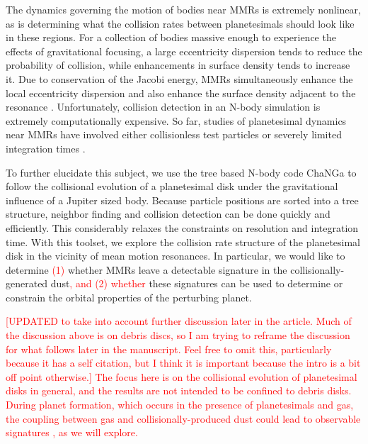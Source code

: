 \documentclass[twocolumn]{aastex63}
\newcommand{\ACBc}[1]{\textcolor{red}{#1}}
\begin{document}
The dynamics governing the motion of bodies near MMRs is extremely nonlinear, as is determining what the collision rates between planetesimals 
should look like in these regions. For a collection of bodies massive enough to experience the effects of gravitational focusing, a large eccentricity 
dispersion tends to reduce the probability of collision, while enhancements in surface density tends to increase it. Due to conservation of the Jacobi 
energy, MMRs simultaneously enhance the local eccentricity dispersion and also enhance the surface density adjacent to the resonance 
\citep{2000Icar..143...45R, 2017ApJ...850..103B}. Unfortunately, collision detection in an N-body simulation is extremely computationally expensive. 
So far, studies of planetesimal dynamics near MMRs have involved either collisionless test particles 
\citep{2017ApJ...850..103B, 2016ApJ...818..159T, 2018ApJ...857....3T} or severely limited integration times \citep{2000Icar..143...45R}.

To further elucidate this subject, we use the tree based N-body code {\sc ChaNGa}
\citep{2008IEEEpds...ChaNGa, 2015AphCom..2..1} to follow the collisional evolution of a planetesimal disk under the gravitational 
influence of a Jupiter sized body. Because particle positions are sorted into a tree structure, neighbor finding and collision detection 
can be done quickly and efficiently. This considerably relaxes the constraints on resolution and integration time. With this toolset, we 
explore the collision rate structure of the planetesimal disk in the vicinity of mean motion resonances. In particular, we would like to 
determine \ACBc{(1)} whether MMRs leave a detectable signature in the collisionally-generated dust\ACBc{, and (2) whether} these signatures can be used to determine or 
constrain the orbital properties of the perturbing planet.

 \ACBc{[UPDATED to take into account further discussion later in the article. Much of the discussion above is on debris discs, so I am trying to reframe the discussion for what follows later in the manuscript. Feel free to omit this, particularly because it has a self citation, but I think it is important because the intro is a bit off point otherwise.]  The focus here is on the collisional evolution of planetesimal disks in general, and the results are not intended to be confined to debris disks.   During planet formation, which occurs in the presence of planetesimals and gas, the coupling between gas and collisionally-produced dust could lead to observable signatures \citep{2017ApJ...850..103B}, as we will explore.  }
\end{document}

